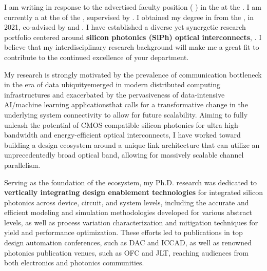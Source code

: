 I am writing in response to the advertised faculty position (\textbf{\appPosition{} \appJobID}) in the \appDept{} at the \appSchool{}. I am currently a \myTitle{} at the \myDept{} of the \mySchoolShort{}, supervised by \mySuper{}. I obtained my \myDegree{} degree in \myMajor{} from the \myPhDSchool{}, in 2021, co-advised by \myAdvisor{} and \myCoAdvisor{}. I have established a diverse yet synergetic research portfolio centered around \textbf{silicon photonics (SiPh) optical interconnects}, \appSpecific{}. I believe that my interdisciplinary research background will make me a great fit to contribute to the continued excellence of your department.

My research is strongly motivated by the prevalence of communication bottleneck in the era of data ubiquity\textemdash emerged in modern distributed computing infrastructures and exacerbated by the pervasiveness of data-intensive AI/machine learning applications\textemdash that calls for a transformative change in the underlying system connectivity to allow for future scalability. Aiming to fully unleash the potential of CMOS-compatible silicon photonics for ultra high-bandwidth and energy-efficient optical interconnects, I have worked toward building a design ecosystem around a unique link architecture that can utilize an unprecedentedly broad optical band, allowing for massively scalable channel parallelism.

Serving as the foundation of the ecosystem, my Ph.D. research was dedicated to \textbf{vertically integrating design enablement technologies} for integrated silicon photonics across device, circuit, and system levels, including the accurate and efficient modeling and simulation methodologies developed for various abstract levels, as well as process variation characterization and mitigation techniques for yield and performance optimization. These efforts led to publications in top design automation conferences, such as DAC and ICCAD, as well as renowned photonics publication venues, such as OFC and JLT, reaching audiences from both electronics and photonics communities.

